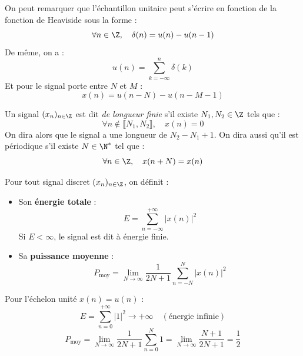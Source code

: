 \begin{remark}
    On peut remarquer que l'échantillon unitaire peut s'écrire en fonction de la fonction 
    de Heaviside sous la forme : 
        $$ \forall n \in \Z, \quad \delta(n) = u(n) - u(n-1) $$ 
    De même, on a : 
        $$ u(n) = \sum_{k = - \infty}^{n} \delta(k) $$ 
    Et pour le signal porte entre $N$ et $M$ :
        $$ x(n) = u(n - N) - u(n - M - 1) $$
\end{remark}

\begin{definition}
    Un signal $(x_n)_{n \in \Z}$ est dit \emph{de longueur finie} s'il 
    existe $ N_1, N_2 \in \Z$ tels que : 
        \begin{equation}
            \forall n \not \in \llbracket N_1, N_2 \rrbracket, \quad x(n) = 0 
        \end{equation}
    On dira alors que le signal a une longueur de $N_2 - N_1 + 1$. 
    On dira aussi qu'il est périodique s'il existe $ N \in \N^*$ tel que : 
        \begin{equation}
            \forall n \in \Z, \quad x(n + N) = x(n) 
        \end{equation}
\end{definition}

\begin{definition}
    Pour tout signal discret $(x_n)_{n \in \Z}$, on définit :
    \begin{itemize}
        \item Son \textbf{énergie totale} :
            \begin{equation}
                E = \sum_{n=-\infty}^{+\infty} |x(n)|^2
            \end{equation}
            Si $E < \infty$, le signal est dit à énergie finie.
        \item Sa \textbf{puissance moyenne} :
            \begin{equation}
                P_{\text{moy}} = \lim_{N \to \infty} \frac{1}{2N+1} \sum_{n=-N}^N |x(n)|^2
            \end{equation}
    \end{itemize}
\end{definition}

\begin{example}
    Pour l'échelon unité $x(n) = u(n)$ :
    $$ E = \sum_{n=0}^{+\infty} |1|^2 \longrightarrow +\infty \quad (\text{énergie infinie}) $$
    $$ P_{\text{moy}} = \lim_{N \to \infty} \frac{1}{2N+1} \sum_{n=0}^N 1 = \lim_{N \to \infty} \frac{N+1}{2N+1} = \frac{1}{2} $$
\end{example}

